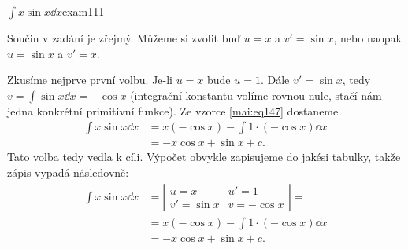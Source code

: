 \begin{mathexam}{\(\int x\sin x\dd{x}\)}{exam111} 
  
  Součin v zadání je zřejmý. Můžeme si zvolit buď \(u=x\) a \(v'=\sin x\), nebo naopak \(u=\sin x\)
  a \(v'= x\).
  
  Zkusíme nejprve první volbu. Je-li \(u=x\) bude \(u=1\). Dále \(v'=\sin x\), tedy \(v=\int\sin
  x\dd{x} = -\cos x\) (integrační konstantu volíme rovnou nule, stačí nám jedna konkrétní primitivní
  funkce). Ze vzorce \eqref{mai:eq147} dostaneme
  \begin{align*}
    \int x\sin x\dd{x} &= x(-\cos x) - \int1\cdot(-\cos x)\dd{x} \\
                       &= -x\cos x + \sin x + c.
  \end{align*}  
  Tato volba tedy vedla k cíli. Výpočet obvykle zapisujeme do jakési tabulky, takže zápis vypadá
  následovně:
  \begin{align*}
    \int x\sin x\dd{x} &= %
      \left\lvert
        \begin{matrix} 
          u = x     & u' =1        \\
          v'=\sin x & v  = -\cos x 
        \end{matrix}  
      \right\rvert =                                              \\
                       & = x(-\cos x) - \int1\cdot(-\cos x)\dd{x} \\
                       &= -x\cos x + \sin x + c.
  \end{align*}  
\end{mathexam}